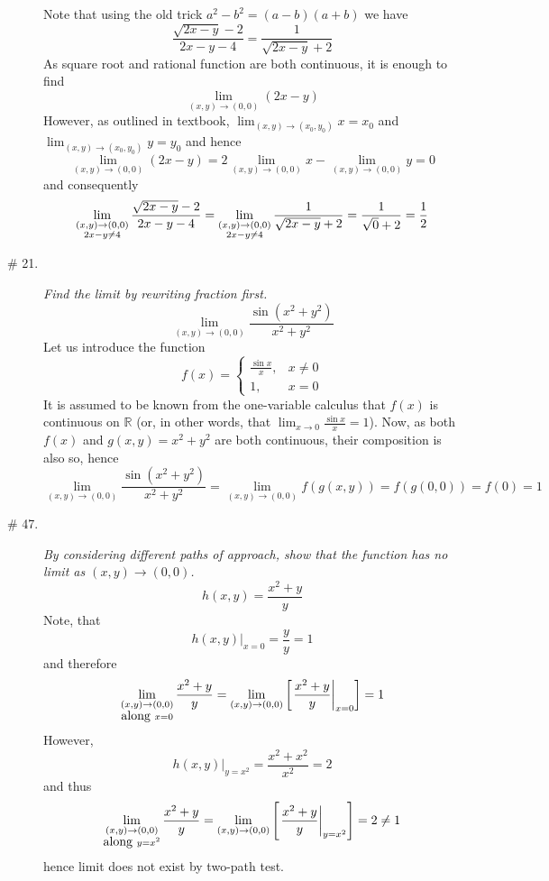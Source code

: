\documentclass[8pt]{article} %
\begin{document}
\begin{description}
{		Note that using the old trick $a^2-b^2=(a-b)(a+b)$ we have
		\[\frac{\sqrt{2x-y}-2}{2x-y-4}=\frac{1}{\sqrt{2x-y}+2}\]
		As square root and rational function are both continuous, it is enough to find \[\lim_{(x,y)\to(0,0)}(2x-y)\]
		However, as outlined in textbook, $\lim_{(x,y)\to(x_0,y_0)}x=x_0$ and $\lim_{(x,y)\to(x_0,y_0)}y=y_0$ and hence
		\[\lim_{(x,y)\to(0,0)}(2x-y)=2\lim_{(x,y)\to(0,0)}x-\lim_{(x,y)\to(0,0)}y=0\]
		and consequently
		\[\lim_{\begin{subarray}{c}(x,y)\to(0,0)\\2x-y\neq4\end{subarray}}\frac{\sqrt{2x-y}-2}{2x-y-4}
			=\lim_{\begin{subarray}{c}(x,y)\to(0,0)\\2x-y\neq4\end{subarray}}\frac{1}{\sqrt{2x-y}+2}=\frac{
				1}{\sqrt{0}+2}=\frac{1}{2}\]
		}
	\item[\# 21.]{{\it Find the limit by rewriting fraction first.}
		\[\lim_{(x,y)\to(0,0)}\frac{\sin(x^2+y^2)}{x^2+y^2}\]
		Let us introduce the function
		\[f(x)=\left\{\begin{array}{ll}\frac{\sin x}{x},&x\neq 0\\1,&x=0\end{array}\right.\]
		It is assumed to be known from the one-variable calculus that $f(x)$ is continuous on $\mathbb{R}$ (or, in other
		words, that $\lim_{x\to 0}\frac{\sin x}{x}=1$). Now, as both $f(x)$ and $g(x,y)=x^2+y^2$ are both continuous,
		their composition is also so, hence
		\[\lim_{(x,y)\to(0,0)}\frac{\sin(x^2+y^2)}{x^2+y^2}=\lim_{(x,y)\to(0,0)}f(g(x,y))=f(g(0,0))=f(0)=1\]
		}
	\item[\# 47.]{{\it By considering different paths of approach, show that the function has no limit as $(x,y)\to(0,0)$.
		\[h(x,y)=\frac{x^2+y}{y}\]}
		Note, that \[h(x,y)\bigg|_{x=0}=\frac{y}{y}=1\]
		and therefore
		\[\lim_{\begin{subarray}{c}(x,y)\to(0,0)\\\mbox{along }x=0\end{subarray}}\frac{x^2+y}{y}=
			\lim_{(x,y)\to(0,0)}\mysbra{\left.\frac{x^2+y}{y}\right|_{x=0}}=1\]
		However, \[\left.h(x,y)\right|_{y=x^2}=\frac{x^2+x^2}{x^2}=2\]
		and thus
		\[\lim_{\begin{subarray}{c}(x,y)\to(0,0)\\\mbox{along }y=x^2\end{subarray}}\frac{x^2+y}{y}=
			\lim_{(x,y)\to(0,0)}\mysbra{\left.\frac{x^2+y}{y}\right|_{y=x^2}}=2\neq 1\]
		hence limit does not exist by two-path test.
}
\end{description}
\end{document}
